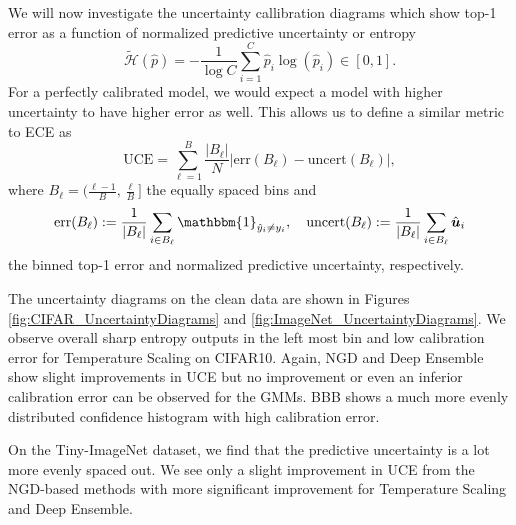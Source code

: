 \documentclass[a4paper, 11pt, oneside]{scrartcl}
\theoremstyle{break}
\newcommand{\matr}[1]{\boldsymbol{#1}}
\numberwithin{equation}{section}
\begin{document}
			We will now investigate the uncertainty callibration diagrams which show top-1 error as a function of normalized predictive uncertainty or entropy \parencite{KT20}
			\begin{equation*}
				\tilde{\mathcal{H}}(\hat{p}) = - \frac{1}{\log C} \sum_{i=1}^C \hat{p}_i \log(\hat{p}_i) \in [0, 1].
			\end{equation*}
			For a perfectly calibrated model, we would expect a model with higher uncertainty to have higher error as well. 
			This allows us to define a similar metric to ECE as 
			\begin{equation*}
				\text{UCE} = \sum_{\ell=1}^{B} \frac{|B_{\ell}|}{N} |\text{err}(B_{\ell}) - \text{uncert}(B_{\ell})|,
			\end{equation*}
			where $B_{\ell} = (\frac{\ell-1}{B}, \frac{\ell}{B}]$ the equally spaced bins and 
			\begin{align*}
				\text{err}(B_{\ell}) := \frac{1}{|B_{\ell}|} \sum_{i \in B_{\ell}} \mathbbm{1}_{\hat{y}_i \neq y_i}, \quad \text{uncert}(B_{\ell}) := \frac{1}{|B_{\ell}|} \sum_{i \in B_{\ell}} \hat{\matr{u}}_i
			\end{align*}
			the binned top-1 error and normalized predictive uncertainty, respectively. 

			The uncertainty diagrams on the clean data are shown in Figures \ref{fig:CIFAR_UncertaintyDiagrams} and \ref{fig:ImageNet_UncertaintyDiagrams}.
			We observe overall sharp entropy outputs in the left most bin and low calibration error for Temperature Scaling on CIFAR10.
			Again, NGD and Deep Ensemble show slight improvements in UCE but no improvement or even an inferior calibration error can be observed for the GMMs. 
			BBB shows a much more evenly distributed confidence histogram with high calibration error.
			
			On the Tiny-ImageNet dataset, we find that the predictive uncertainty is a lot more evenly spaced out.
			We see only a slight improvement in UCE from the NGD-based methods with more significant improvement for Temperature Scaling and Deep Ensemble. 
\end{document}
